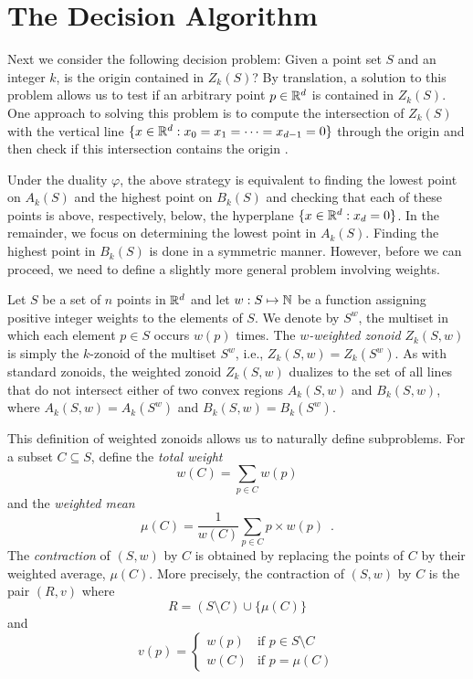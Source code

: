 \documentclass[lotsofwhite]{patmorin}
\newcommand{\dual}{\varphi}
\begin{document}
\section{The Decision Algorithm}

Next we consider the following decision problem:  Given a point set
$S$ and an integer $k$, is the origin contained in $Z_k(S)$?  By
translation, a solution to this problem allows us to test if an
arbitrary point $p\in\mathbb{R}^d$ is contained in $Z_k(S)$. One approach to
solving this problem is to compute the intersection of $Z_k(S)$ with
the vertical line $\{x\in\mathbb{R}^d:x_0=x_1=\cdots=x_{d-1}=0\}$ through the origin
and then check if this intersection contains the origin \cite{gm04}. 

Under the duality $\dual$, the above strategy is equivalent to finding
the lowest point on $A_k(S)$ and the highest point on $B_k(S)$ and
checking that each of these points is above, respectively, below, the
hyperplane $\{x\in\mathbb{R}^d:x_d=0\}$.  In the remainder, we focus on
determining the lowest point in $A_k(S)$.  Finding the highest point
in $B_k(S)$ is done in a symmetric manner.  However, before we can
proceed, we need to define a slightly more general problem involving
weights.

Let $S$ be a set of $n$ points in $\mathbb{R}^d$ and let $w:S\mapsto\mathbb{N}$ be a
function assigning positive integer weights to the elements of $S$.
We denote by $S^w$, the multiset in which each element $p\in S$ occurs
$w(p)$ times.  The \emph{$w$-weighted zonoid} $Z_k(S,w)$ is simply the
$k$-zonoid of the multiset $S^w$, i.e., $Z_k(S,w)=Z_k(S^w)$.  As with
standard zonoids, the weighted zonoid $Z_k(S,w)$ dualizes to the set
of all lines that do not intersect either of two convex regions
$A_k(S,w)$ and $B_k(S,w)$, where $A_k(S,w)=A_k(S^w)$ and
$B_k(S,w)=B_k(S^w)$.

This definition of weighted zonoids allows us to naturally define
subproblems.  For a subset $C\subseteq S$, define the \emph{total
weight}
\[
       w(C)=\sum_{p\in C}w(p)
\]
and the \emph{weighted mean}
\[ 
       \mu(C)=\frac{1}{w(C)}\sum_{p\in C} p\times w(p) \enspace .
\]
The \emph{contraction} of
$(S,w)$ by $C$ is obtained by replacing the points of $C$ by their
weighted average, $\mu(C)$.  More precisely, the contraction of
$(S,w)$ by $C$ is the pair $(R,v)$ where 
\[ R = (S\setminus C) \cup \{ \mu(C) \} \] 
and 
\[ v(p) = \left\{\begin{array}{ll} 
        w(p) & \mbox{if $p\in S\setminus C$} \\ 
        w(C) & \mbox{if $p=\mu(C)$} \end{array}\right.
\]
\end{document}
